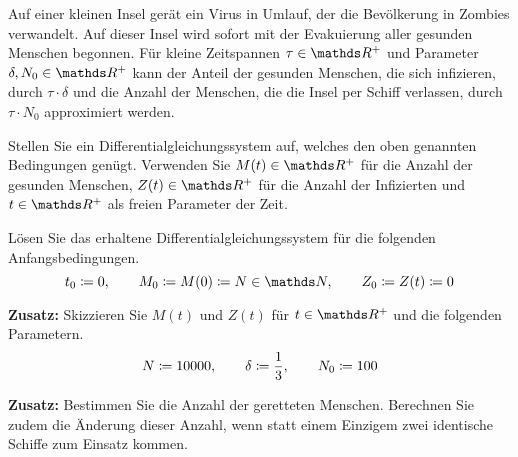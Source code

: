 \begin{atiTask}[
	title = Ein Ausweg aus der Zombieapokalypse
]
	Auf einer kleinen Insel gerät ein Virus in Umlauf, der die Bevölkerung in Zombies verwandelt.
	Auf dieser Insel wird sofort mit der Evakuierung aller gesunden Menschen begonnen.
	Für kleine  Zeitspannen $\tau\in\setR^+$ und Parameter $\delta,N_0\in\setR^+$ kann der Anteil der gesunden Menschen, die sich infizieren, durch $\tau\cdot\delta$ und die Anzahl der Menschen, die die Insel per Schiff verlassen, durch $\tau\cdot N_0$ approximiert werden.
	\begin{atiSubtasks}
		\item{
			Stellen Sie ein Differentialgleichungssystem auf, welches den oben genannten Bedingungen genügt.
			Verwenden Sie $M(t)\in\setR^+$ für die Anzahl der gesunden Menschen, $Z(t)\in\setR^+$ für die Anzahl der Infizierten und $t\in\setR^+$ als freien Parameter der Zeit.

		}
		\item{
			Lösen Sie das erhaltene Differentialgleichungssystem für die folgenden Anfangsbedingungen.
			\[
				t_0 \define 0 \separate M_0\define M(0)\define N\in\setN \separate Z_0\define Z(t) \define 0
			\]
		}
		\item{
			\textbf{Zusatz:} Skizzieren Sie $M(t)$ und $Z(t)$ für $t\in\setR^+$ und die folgenden Parametern.
			\[
				N \coloneqq 10000,\qquad \delta \coloneqq \frac{1}{3} ,\qquad N_0 \coloneqq 100
			\]
		}
		\item{
			\textbf{Zusatz:}
			Bestimmen Sie die Anzahl der geretteten Menschen.
			Berechnen Sie zudem die Änderung dieser Anzahl, wenn statt einem Einzigem zwei identische Schiffe zum Einsatz kommen.
		}
	\end{atiSubtasks}
\end{atiTask}